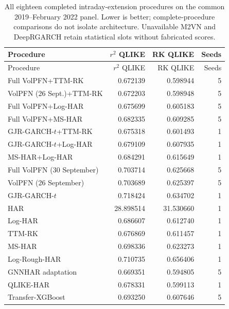\begingroup\small\setlength{\tabcolsep}{4pt}
\begin{longtable}{@{}>{\raggedright\arraybackslash}p{6.5cm}rrr@{}}
\caption[Complete realised-risk scores]{All eighteen completed intraday-extension procedures on the common 2019--February 2022 panel. Lower is better; complete-procedure comparisons do not isolate architecture. Unavailable M2VN and DeepRGARCH retain statistical slots without fabricated scores.}\label{tab:new-intraday-all}\\
\toprule
Procedure & $r^2$ QLIKE & RK QLIKE & Seeds \\
\midrule\endfirsthead
\toprule
Procedure & $r^2$ QLIKE & RK QLIKE & Seeds \\
\midrule\endhead
Full VolPFN+TTM-RK & 0.672139 & 0.598944 & 5 \\
VolPFN (26 Sept.)+TTM-RK & 0.672203 & 0.598948 & 5 \\
Full VolPFN+Log-HAR & 0.675699 & 0.605183 & 5 \\
Full VolPFN+MS-HAR & 0.682335 & 0.609285 & 5 \\
GJR-GARCH-$t$+TTM-RK & 0.675318 & 0.601493 & 1 \\
GJR-GARCH-$t$+Log-HAR & 0.679109 & 0.607935 & 1 \\
MS-HAR+Log-HAR & 0.684291 & 0.615649 & 1 \\
Full VolPFN (30 September) & 0.703714 & 0.625668 & 5 \\
VolPFN (26 September) & 0.703689 & 0.625397 & 5 \\
GJR-GARCH-$t$ & 0.718424 & 0.634702 & 1 \\
HAR & 28.898514 & 31.530660 & 1 \\
Log-HAR & 0.686607 & 0.612740 & 1 \\
TTM-RK & 0.676869 & 0.611457 & 1 \\
MS-HAR & 0.698336 & 0.623273 & 1 \\
Log-Rough-HAR & 0.710735 & 0.656406 & 1 \\
GNNHAR adaptation & 0.669351 & 0.594805 & 5 \\
QLIKE-HAR & 0.678331 & 0.599113 & 1 \\
Transfer-XGBoost & 0.693250 & 0.607646 & 5 \\
\bottomrule
\end{longtable}\endgroup
